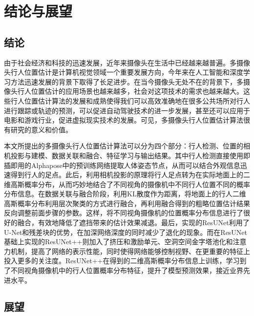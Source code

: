 
\chapter{结论与展望}

\section{结论}

由于社会经济和科技的迅速发展，近年来摄像头在生活中已经越来越普遍。多摄像头行人位置估计是计算机视觉领域一个重要发展方向，今年来在人工智能和深度学习方法迅速发展的背景下取得了长足进步。在当今摄像头无处不在的背景下，多摄像头行人位置估计的应用场景也越来越多，社会对这项技术的需求也越来越大。这些行人位置估计算法的发展和成熟使得我们可以高效准确地在很多公共场所对行人进行跟踪或轨迹的预测，可以促进自动驾驶技术的进一步发展，甚至还可以应用于电影和游戏行业，促进虚拟现实技术的发展。可见，多摄像头行人位置估计算法很有研究的意义和价值。

本文所提出的多摄像头行人位置估计算法可以分为四个部分：行人检测、位置的相机投影与建模、数据关联和融合、特征学习与输出结果。其中行人检测直接使用即插即用的Alphapose中的预训练网络提取人体姿态节点，从而可以结合外观信息迅速得到行人的足点。此后，利用相机投影的原理将行人足点转为在实际地面上的二维高斯概率分布，从而巧妙地结合了不同视角的摄像机中不同行人位置不同的概率分布信息。在数据关联与融合阶段，利用KL散度作为距离，将地面上的行人二维高斯概率分布利用层次聚类的方式进行融合，再利用融合得到的粗略位置估计结果反向调整前面步骤的参数。这样，将不同视角摄像机的位置概率分布信息进行了很好的融合，有效地降低了遮挡带来的估计效果减退。最后，实现的ResUNet利用了U-Net和残差块的优势，在加深网络深度的同时减少了退化的现象。而在ResUNet基础上实现的ResUNet++则加入了挤压和激励单元、空洞空间金字塔池化和注意力机制，提高了网络的表示性能，同时使得网络能够控制视野、在更重要的特征上投入更多的关注度。ResUNet++在得到的二维高斯概率分布信息上训练，学习到了不同视角摄像机中的行人位置概率分布特征，提升了模型预测效果，接近业界先进水平。

\section{展望}

